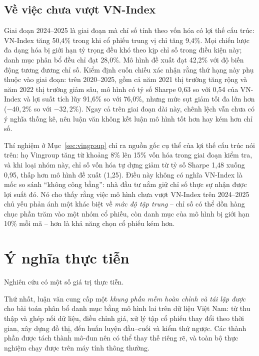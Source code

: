 \subsection{Về việc chưa vượt VN-Index}

Giai đoạn 2024--2025 là giai đoạn mà chỉ số tính theo vốn hóa có lợi thế cấu trúc: VN-Index tăng 50,4\% trong khi cổ phiếu trung vị chỉ tăng 9,4\%. Mọi chiến lược đa dạng hóa bị giới hạn tỷ trọng đều khó theo kịp chỉ số trong điều kiện này; danh mục phân bổ đều chỉ đạt 28,0\%. Mô hình đề xuất đạt 42,2\% với độ biến động tương đương chỉ số. Kiểm định cuốn chiếu xác nhận rằng thứ hạng này phụ thuộc vào giai đoạn: trên 2020--2025, gồm cả năm 2021 thị trường tăng rộng và năm 2022 thị trường giảm sâu, mô hình có tỷ số Sharpe 0,63 so với 0,54 của VN-Index và lợi suất tích lũy 91,6\% so với 76,0\%, nhưng mức sụt giảm tối đa lớn hơn ($-40{,}2\%$ so với $-32{,}2\%$). Ngay cả trên giai đoạn dài này, chênh lệch vẫn chưa có ý nghĩa thống kê, nên luận văn không kết luận mô hình tốt hơn hay kém hơn chỉ số.

Thí nghiệm ở Mục~\ref{sec:vingroup} chỉ ra nguồn gốc cụ thể của lợi thế cấu trúc nói trên: họ Vingroup tăng từ khoảng 8\% lên 15\% vốn hóa trong giai đoạn kiểm tra, và khi loại nhóm này, chỉ số vốn hóa tự dựng giảm từ tỷ số Sharpe 1,48 xuống 0,95, thấp hơn mô hình đề xuất (1,25). Điều này không có nghĩa VN-Index là mốc so sánh ``không công bằng'': nhà đầu tư nắm giữ chỉ số thực sự nhận được lợi suất đó. Nó cho thấy rằng việc mô hình chưa vượt VN-Index trên 2024--2025 chủ yếu phản ánh một khác biệt về \emph{mức độ tập trung} -- chỉ số có thể dồn hàng chục phần trăm vào một nhóm cổ phiếu, còn danh mục của mô hình bị giới hạn 10\% mỗi mã -- hơn là khả năng chọn cổ phiếu kém hơn.



\section{Ý nghĩa thực tiễn}

Nghiên cứu có một số giá trị thực tiễn.

Thứ nhất, luận văn cung cấp một \emph{khung phần mềm hoàn chỉnh và tái lập được} cho bài toán phân bổ danh mục bằng mô hình lai trên dữ liệu Việt Nam: từ thu thập và ghép nối dữ liệu, điều chỉnh giá, xử lý tập cổ phiếu thay đổi theo thời gian, xây dựng đồ thị, đến huấn luyện đầu--cuối và kiểm thử ngược. Các thành phần được tách thành mô-đun nên có thể thay thế riêng rẽ, và toàn bộ thực nghiệm chạy được trên máy tính thông thường.

